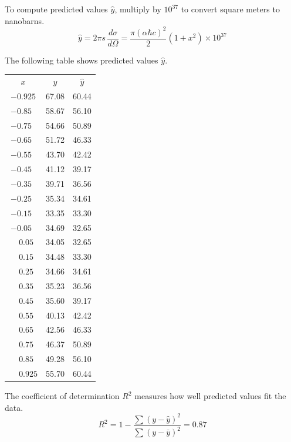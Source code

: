 To compute predicted values $\hat{y}$, multiply by $10^{37}$ to convert square meters to nanobarns.
\begin{equation*}
\hat y=2\pi s\,\frac{d\sigma}{d\Omega}
=\frac{\pi(\alpha\hbar c)^2}{2}\left(1+x^2\right)\times10^{37}
\end{equation*}

The following table shows predicted values $\hat{y}$.

\begin{center}
\begin{tabular}{ccc}
$x$ & $y$ & $\hat{y}$
\\[1ex]
$-0.925$ & 67.08 & 60.44\\
$-0.85\phantom{0}$ & 58.67 & 56.10\\
$-0.75\phantom{0}$ & 54.66 & 50.89\\
$-0.65\phantom{0}$ & 51.72 & 46.33\\
$-0.55\phantom{0}$ & 43.70 & 42.42\\
$-0.45\phantom{0}$ & 41.12 & 39.17\\
$-0.35\phantom{0}$ & 39.71 & 36.56\\
$-0.25\phantom{0}$ & 35.34 & 34.61\\
$-0.15\phantom{0}$ & 33.35 & 33.30\\
$-0.05\phantom{0}$ & 34.69 & 32.65\\
$\phantom{+}0.05\phantom{0}$ & 34.05 & 32.65\\
$\phantom{+}0.15\phantom{0}$ & 34.48 & 33.30\\
$\phantom{+}0.25\phantom{0}$ & 34.66 & 34.61\\
$\phantom{+}0.35\phantom{0}$ & 35.23 & 36.56\\
$\phantom{+}0.45\phantom{0}$ & 35.60 & 39.17\\
$\phantom{+}0.55\phantom{0}$ & 40.13 & 42.42\\
$\phantom{+}0.65\phantom{0}$ & 42.56 & 46.33\\
$\phantom{+}0.75\phantom{0}$ & 46.37 & 50.89\\
$\phantom{+}0.85\phantom{0}$ & 49.28 & 56.10\\
$\phantom{+}0.925$ & 55.70 & 60.44
\end{tabular}
\end{center}

The coefficient of determination $R^2$ measures how well predicted values fit the data.
\begin{equation*}
R^2=1-\frac{\sum(y-\hat{y})^2}{\sum(y-\bar{y})^2}=0.87
\end{equation*}


